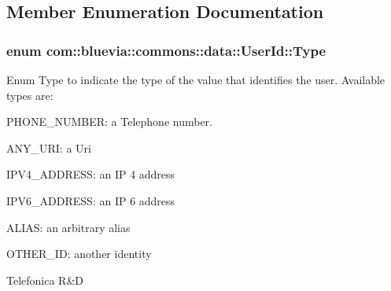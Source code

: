 \subsection{Member Enumeration Documentation}
\hypertarget{classcom_1_1bluevia_1_1commons_1_1data_1_1UserId_a159e600181e6a14e769bb0a86f2c981a}{
\subsubsection[{Type}]{\setlength{\rightskip}{0pt plus 5cm}enum {\bf com::bluevia::commons::data::UserId::Type}}}
\label{classcom_1_1bluevia_1_1commons_1_1data_1_1UserId_a159e600181e6a14e769bb0a86f2c981a}
Enum Type to indicate the type of the value that identifies the user. Available types are: 
\begin{DoxyItemize}
\item PHONE\_\-NUMBER: a Telephone number. 
\item ANY\_\-URI: a Uri 
\item IPV4\_\-ADDRESS: an IP 4 address 
\item IPV6\_\-ADDRESS: an IP 6 address 
\item ALIAS: an arbitrary alias 
\item OTHER\_\-ID: another identity 
\begin{DoxyItemize}
\end{DoxyItemize}Telefonica R\&D 
\end{DoxyItemize}

